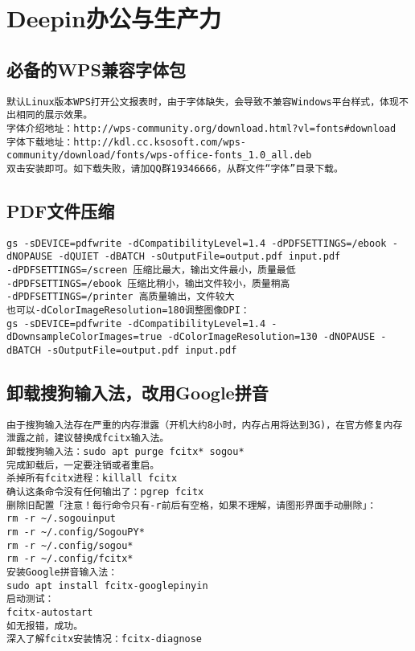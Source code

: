 \documentclass[a4paper,fontset=fandol,zihao=-4,linespread=1.2]{ctexbook}
\begin{document}
\chapter{Deepin办公与生产力}

\section{必备的WPS兼容字体包}
\begin{lstlisting}
默认Linux版本WPS打开公文报表时，由于字体缺失，会导致不兼容Windows平台样式，体现不出相同的展示效果。
字体介绍地址：http://wps-community.org/download.html?vl=fonts#download
字体下载地址：http://kdl.cc.ksosoft.com/wps-community/download/fonts/wps-office-fonts_1.0_all.deb
双击安装即可。如下载失败，请加QQ群19346666，从群文件“字体”目录下载。
\end{lstlisting}

\section{PDF文件压缩}
\begin{lstlisting}
gs -sDEVICE=pdfwrite -dCompatibilityLevel=1.4 -dPDFSETTINGS=/ebook -dNOPAUSE -dQUIET -dBATCH -sOutputFile=output.pdf input.pdf
-dPDFSETTINGS=/screen 压缩比最大，输出文件最小，质量最低
-dPDFSETTINGS=/ebook 压缩比稍小，输出文件较小，质量稍高
-dPDFSETTINGS=/printer 高质量输出，文件较大
也可以-dColorImageResolution=180调整图像DPI：
gs -sDEVICE=pdfwrite -dCompatibilityLevel=1.4 -dDownsampleColorImages=true -dColorImageResolution=130 -dNOPAUSE -dBATCH -sOutputFile=output.pdf input.pdf
\end{lstlisting}

\section{卸载搜狗输入法，改用Google拼音}
\begin{lstlisting}
由于搜狗输入法存在严重的内存泄露（开机大约8小时，内存占用将达到3G)，在官方修复内存泄露之前，建议替换成fcitx输入法。
卸载搜狗输入法：sudo apt purge fcitx* sogou*
完成卸载后，一定要注销或者重启。
杀掉所有fcitx进程：killall fcitx
确认这条命令没有任何输出了：pgrep fcitx
删除旧配置「注意！每行命令只有-r前后有空格，如果不理解，请图形界面手动删除」：
rm -r ~/.sogouinput
rm -r ~/.config/SogouPY*
rm -r ~/.config/sogou*
rm -r ~/.config/fcitx*
安装Google拼音输入法：
sudo apt install fcitx-googlepinyin
启动测试：
fcitx-autostart
如无报错，成功。
深入了解fcitx安装情况：fcitx-diagnose
\end{lstlisting}
\end{document}
